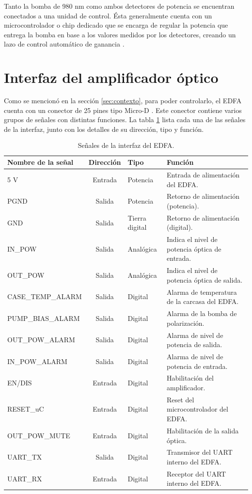 Tanto la bomba de 980 nm como ambos detectores de potencia se encuentran conectados a una unidad de control. Ésta generalmente cuenta con un microcontrolador o chip dedicado que se encarga de regular la potencia que entrega la bomba en base a los valores medidos por los detectores, creando un lazo de control automático de ganancia \citep{WEBSITE:EDFA2}\citep{WEBSITE:EDFA1}.

\section{Interfaz del amplificador óptico}
\label{sec:intAmp}

Como se mencionó en la sección \ref{sec:contexto}, para poder controlarlo, el EDFA cuenta con un conector de 25 pines tipo Micro-D \citep{WEBSITE:MICROD_DS}. Este conector contiene varios grupos de señales con distintas funciones. La tabla \ref{tab:señalesConector} lista cada una de las señales de la interfaz, junto con los detalles de su dirección, tipo y función.

\begin{table}[H]
	\centering
	\caption{Señales de la interfaz del EDFA.}
	\begin{tabular}{l c p{1.5cm} p{5cm}}
		\toprule
		\textbf{Nombre de la señal}	& \textbf{Dirección}	& \textbf{Tipo} & \textbf{Función} \\
		\midrule
		5 V 					& Entrada	& Potencia			& Entrada de alimentación del EDFA. \\		
		PGND				& Salida	& Potencia  		& Retorno de alimentación (potencia). \\
		GND					& Salida	& Tierra digital  	& Retorno de alimentación (digital). \\
		IN\_POW				& Salida	& Analógica 		& Indica el nivel de potencia óptica de entrada. \\
		OUT\_POW			& Salida	& Analógica 		& Indica el nivel de potencia óptica de salida. \\
		CASE\_TEMP\_ALARM	& Salida	& Digital 			& Alarma de temperatura de la carcasa del EDFA. \\
		PUMP\_BIAS\_ALARM	& Salida	& Digital 			& Alarma de la bomba de polarización. \\
		OUT\_POW\_ALARM		& Salida	& Digital 			& Alarma de nivel de potencia de salida. \\
		IN\_POW\_ALARM		& Salida	& Digital 			& Alarma de nivel de potencia de entrada. \\
		EN/DIS				& Entrada	& Digital 			& Habilitación del amplificador. \\
		RESET\_uC			& Entrada	& Digital 			& Reset del microcontrolador del EDFA. \\
		OUT\_POW\_MUTE		& Entrada	& Digital 			& Habilitación de la salida óptica. \\
		UART\_TX			& Salida	& Digital 			& Transmisor del UART interno del EDFA. \\
		UART\_RX			& Entrada	& Digital 			& Receptor del UART interno del EDFA. \\
		\bottomrule
		\hline
	\end{tabular}
	\label{tab:señalesConector}
\end{table}

